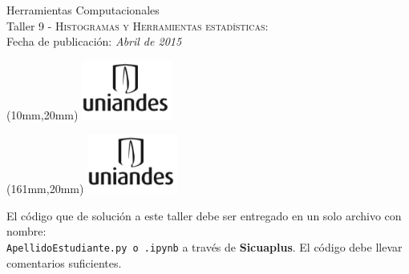 \documentclass[11pt,letterpaper]{exam}
\begin{document}
\begin{center}
{\Large Herramientas Computacionales} \\
Taller 9 - \textsc{Histogramas y Herramientas estadísticas}:\\

Fecha de publicación: {\small \it Abril de 2015}\\
\end{center}

\begin{textblock*}{40mm}(10mm,20mm)
  \includegraphics[width=3cm]{logoUniandes.png}
\end{textblock*}

\begin{textblock*}{40mm}(161mm,20mm)
  \includegraphics[width=3cm]{logoUniandes.png}
\end{textblock*}

\vspace{0.5cm}

\noindent El código que de solución a este taller debe ser entregado en un solo archivo con nombre:\\
 \verb+ApellidoEstudiante.py o .ipynb+ a través de \textbf{Sicuaplus}. El código debe llevar comentarios suficientes.

\vspace{0.5cm}
\end{document}
